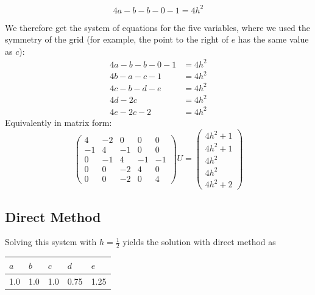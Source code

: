 \documentclass{article}
\numberwithin{equation}{section}
\theoremstyle{definition}
\begin{document}
\begin{equation}
    4a - b - b - 0 - 1 = 4h^2
\end{equation}


We therefore get the system of equations for the five variables, where we used the symmetry of the grid (for example, the point to the right of $e$ has the same value as $c$):
\begin{align}
    4a - b - b - 0 - 1 &= 4h^2 \\
    4b - a - c - 1 &= 4h^2 \\
    4c - b - d - e &= 4h^2 \\
    4d - 2c &= 4h^2 \\
    4e - 2c -2 &= 4h^2
\end{align}
Equivalently in matrix form:
\begin{equation}
    \begin{pmatrix}
        4 & -2 & 0 & 0 & 0\\ 
        -1 & 4 & -1 & 0 & 0\\ 
        0 & -1 & 4 & -1 & -1\\ 
        0 & 0 & -2 & 4 & 0\\ 
        0 & 0 & -2 & 0 & 4
        \end{pmatrix}U=\begin{pmatrix}
        4h^2 + 1\\ 
        4h^2 + 1\\ 
        4h^2\\ 
        4h^2\\
        4h^2 + 2
        \end{pmatrix}
\end{equation}
\subsection{Direct Method}
Solving this system with $h=\frac12$ yields the solution with direct method  as

\begin{table}[H]
    \centering
    \begin{tabular}{|m{2.159cm}|m{2.159cm}|m{2.159cm}|m{2.159cm}|m{2.159cm}|}
    \hline
    $a$ & $b$ & $c$ & $d$  & $e$  \\ \hline
    1.0 & 1.0 & 1.0 & 0.75 & 1.25 \\ \hline
    \end{tabular}
\end{table}
\end{document}
